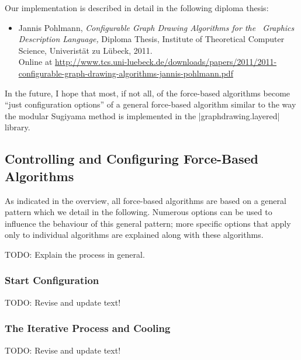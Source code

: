 Our implementation is described in detail in the following
diploma thesis:

\begin{itemize}
\item
  Jannis Pohlmann,
  \newblock \emph{Configurable Graph Drawing Algorithms
    for the \tikzname\ Graphics Description Language,}
  \newblock Diploma Thesis,
  \newblock Institute of Theoretical Computer Science, Univerist\"at
  zu L\"ubeck, 2011.\\[.5em]
  \newblock Online at 
  \url{http://www.tcs.uni-luebeck.de/downloads/papers/2011/2011-configurable-graph-drawing-algorithms-jannis-pohlmann.pdf}
\end{itemize}

In the future, I hope that most, if not all, of the force-based
algorithms become ``just configuration options'' of a general
force-based algorithm similar to the way the modular Sugiyama method
is implemented in the |graphdrawing.layered| library.



\subsection{Controlling and Configuring Force-Based Algorithms}

As indicated in the overview, all force-based algorithms are based on
a general pattern which we detail in the following. Numerous options
can be used to influence the behaviour of this general pattern; more
specific options that apply only to individual algorithms are
explained along with these algorithms.

TODO: Explain the process in general.


\subsubsection{Start Configuration}

TODO: Revise and update text! 



\subsubsection{The Iterative Process and Cooling}

TODO: Revise and update text! 

